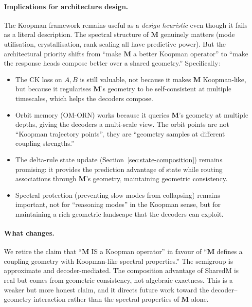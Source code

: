 \documentclass[11pt, a4paper]{article}
\newcommand{\M}{\mathbf{M}}
\theoremstyle{plain}
\theoremstyle{remark}
\begin{document}
\paragraph{Implications for architecture design.}
The Koopman framework remains useful as a \emph{design heuristic} even though it fails as a literal description.
The spectral structure of $\M$ genuinely matters (mode utilisation, crystallisation, rank scaling all have predictive power).
But the architectural priority shifts from ``make $\M$ a better Koopman operator'' to ``make the response heads compose better over a shared geometry.''
Specifically:
\begin{itemize}[nosep]
    \item The CK loss on $A, B$ is still valuable, not because it makes $\M$ Koopman-like, but because it regularises $\M$'s geometry to be self-consistent at multiple timescales, which helps the decoders compose.
    \item Orbit memory (OM-ORN) works because it queries $\M$'s geometry at multiple depths, giving the decoders a multi-scale view.
    The orbit points are not ``Koopman trajectory points'', they are ``geometry samples at different coupling strengths.''
    \item The delta-rule state update (Section~\ref{sec:state-composition}) remains promising: it provides the prediction advantage of state while routing associations through $\M$'s geometry, maintaining geometric consistency.
    \item Spectral protection (preventing slow modes from collapsing) remains important, not for ``reasoning modes'' in the Koopman sense, but for maintaining a rich geometric landscape that the decoders can exploit.
\end{itemize}

\paragraph{What changes.}
We retire the claim that ``$\M$ IS a Koopman operator'' in favour of ``$\M$ defines a coupling geometry with Koopman-like spectral properties.''
The semigroup is approximate and decoder-mediated.
The composition advantage of SharedM is real but comes from geometric consistency, not algebraic exactness.
This is a weaker but more honest claim, and it directs future work toward the decoder--geometry interaction rather than the spectral properties of $\M$ alone.

\end{document}

